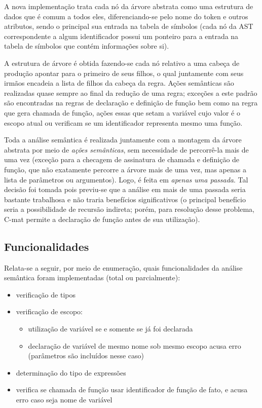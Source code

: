 \documentclass[
	article,			%
	11pt,				%
	oneside,			%
	a4paper,			%
	english,			%
	brazil,				%
	sumario=tradicional
	]{abntex2}
\renewcommand{\it}[1]{\textit{#1}}
\begin{document}
A nova implementação trata cada nó da árvore abstrata como uma estrutura de dados que é comum a todos eles, diferenciando-se pelo nome do token e outros atributos, sendo o principal sua entrada na tabela de símbolos (cada nó da AST correspondente a algum identificador possui um 
ponteiro para a entrada na tabela de símbolos que contém informações sobre si).

A estrutura de árvore é obtida fazendo-se cada nó relativo a uma cabeça de produção apontar para o primeiro de seus filhos, o qual juntamente com seus irmãos encadeia a lista de filhos da cabeça da regra. Ações semânticas são realizadas quase sempre ao final da redução de uma regra; exceções a este padrão
são encontradas na regras de declaração e definição de função bem como na regra que gera chamada de função, ações essas que setam a variável cujo valor é o escopo atual ou verificam se um
identificador representa mesmo uma função.

Toda a análise semântica é realizada juntamente com a montagem da árvore abstrata por meio de \it{ações semânticas}, sem necessidade de percorrê-la mais de uma vez (exceção para a checagem de assinatura de chamada e definição de função, que não exatamente percorre a árvore mais de uma vez, mas apenas a lista de parâmetros ou argumentos). Logo, é feita em \it{apenas uma passada}. Tal decisão foi tomada pois previu-se que a análise em mais de uma passada seria bastante trabalhosa e não traria benefícios significativos (o principal
benefício seria a possibilidade de recursão indireta; porém, para resolução desse problema, C-mat permite a declaração de função antes de sua utilização).

\subsection{Funcionalidades}
Relata-se a seguir, por meio de enumeração, quais funcionalidades da análise semântica foram implementadas (total ou parcialmente):
\begin{itemize}
	\item verificação de tipos
	\item verificação de escopo:
		\begin{itemize}
			\item utilização de variável se e somente se já foi declarada
			\item declaração de variável de mesmo nome sob mesmo escopo acusa erro (parâmetros são incluídos nesse caso)
		\end{itemize}
	\item determinação do tipo de expressões
	\item verifica se chamada de função usar identificador de função de fato, e acusa erro caso seja nome de variável
\end{itemize}
\end{document}
